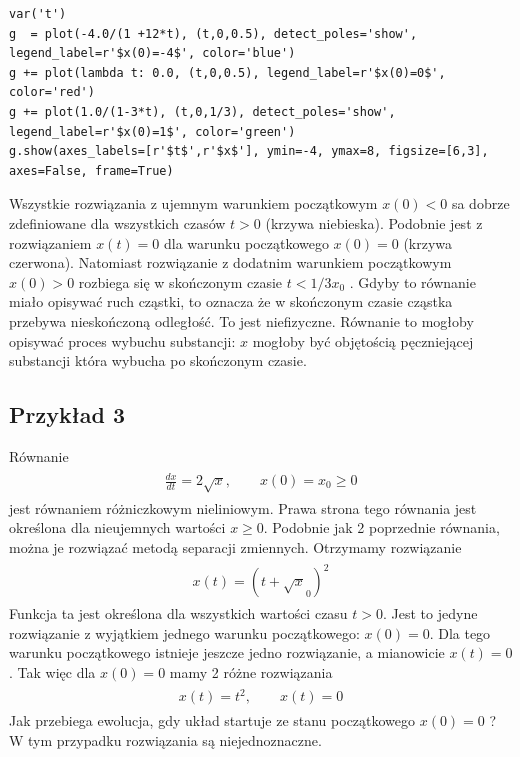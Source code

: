 \documentclass[a4paper,12pt,polish]{sphinxmanual}
\begin{document}
\begin{verbatim}
var('t')
g  = plot(-4.0/(1 +12*t), (t,0,0.5), detect_poles='show', legend_label=r'$x(0)=-4$', color='blue')
g += plot(lambda t: 0.0, (t,0,0.5), legend_label=r'$x(0)=0$', color='red')
g += plot(1.0/(1-3*t), (t,0,1/3), detect_poles='show', legend_label=r'$x(0)=1$', color='green')
g.show(axes_labels=[r'$t$',r'$x$'], ymin=-4, ymax=8, figsize=[6,3], axes=False, frame=True)
\end{verbatim}


Wszystkie rozwiązania z ujemnym warunkiem początkowym $x(0) < 0$ sa dobrze zdefiniowane dla wszystkich czasów $t>0$ (krzywa niebieska). Podobnie jest z rozwiązaniem $x(t) = 0$ dla warunku początkowego $x(0)=0$ (krzywa czerwona). Natomiast rozwiązanie z  dodatnim warunkiem początkowym $x(0) > 0$ rozbiega się w skończonym czasie $t< 1/3x_0$ . Gdyby to równanie miało opisywać ruch cząstki, to oznacza że w skończonym czasie cząstka przebywa nieskończoną odległość. To jest niefizyczne. Równanie  to mogłoby   opisywać proces wybuchu  substancji: $x$ mogłoby być objętością pęczniejącej substancji która  wybucha po skończonym czasie.


\subsection{Przykład 3}
\label{ch1/chI012:przyklad-3}
Równanie
\label{ch1/chI012:equation-eqn5}\begin{gather}
\begin{split}\frac{dx}{dt}=  2 \sqrt x, \qquad x(0) = x_0 \ge 0\end{split}\label{ch1/chI012-eqn5}
\end{gather}
jest równaniem różniczkowym nieliniowym.  Prawa strona tego równania jest określona dla nieujemnych wartości $x \ge 0$.  Podobnie jak  2 poprzednie równania, można  je rozwiązać metodą separacji zmiennych. Otrzymamy rozwiązanie
\label{ch1/chI012:equation-eqn6}\begin{gather}
\begin{split}x(t) = (t +  \sqrt x_0)^2\end{split}\label{ch1/chI012-eqn6}
\end{gather}
Funkcja ta jest określona dla wszystkich wartości czasu $t >0$.   Jest to jedyne  rozwiązanie  z wyjątkiem jednego warunku początkowego: $x(0) = 0$. Dla tego warunku początkowego istnieje jeszcze jedno rozwiązanie, a mianowicie $x(t) = 0$. Tak więc dla $x(0) = 0$ mamy  2 różne rozwiązania
\label{ch1/chI012:equation-eqn7}\begin{gather}
\begin{split}x(t) = t^2, \qquad x(t) = 0\end{split}\label{ch1/chI012-eqn7}
\end{gather}
Jak przebiega ewolucja, gdy układ startuje ze stanu początkowego $x(0) = 0$ ? W tym przypadku rozwiązania są niejednoznaczne.
\end{document}
